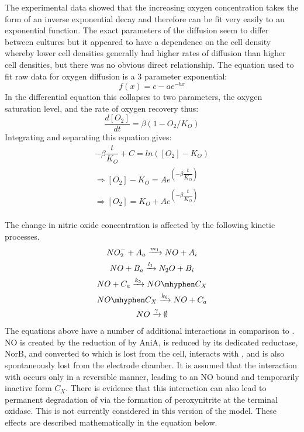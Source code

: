 The experimental data showed that the increasing oxygen concentration takes the form of an inverse exponential decay and therefore can be fit very easily to an exponential function. The exact parameters of the diffusion seem to differ between cultures but it appeared to have a dependence on the cell density whereby lower cell densities generally had higher rates of diffusion than higher cell densities, but there was no obvious direct relationship.
The equation used to fit raw data for oxygen diffusion is a 3 parameter exponential:
\begin{equation*}
f(x) = c - ae^{-bx}
\end{equation*}
In the differential equation this collapses to two parameters, the oxygen saturation level, and the rate of oxygen recovery thus:
\begin{equation*}
\dfrac{d[O_2]}{dt} = \beta(1-O_2/K_O)
\end{equation*}
Integrating and separating this equation gives:
\begin{equation*}
\begin{gathered}
-\beta\dfrac{t}{K_O} + C = ln([O_2]-K_O)\\
\Rightarrow [O_2]-K_O = Ae^{\left(-\beta\dfrac{t}{K_O}\right)}\\
\Rightarrow [O_2] = K_O + Ae^{\left(-\beta\dfrac{t}{K_O}\right)}
\end{gathered}
\end{equation*}
\clearpage
{}\\
The change in nitric oxide concentration is affected by the following kinetic processes.
\begin{equation*}
\begin{gathered}
NO_2^- + A_a \xrightarrow{m_1} NO + A_i\\
NO + B_a \xrightarrow{l_1} N_2O + B_i\\
NO + C_a \xrightarrow{k_5} NO\mhyphen C_X\\
NO\mhyphen C_X \xrightarrow{k_6} NO + C_a\\
NO \xrightarrow{\gamma} \emptyset
\end{gathered}
\end{equation*}
The equations above have a number of additional interactions in comparison to \cOxygen{}. NO is created by the reduction of \cNitrite{} by AniA, is reduced by its dedicated reductase, NorB, and converted to \cNtwoO{} which is lost from the cell, interacts with \cbbthree{}, and is also spontaneously lost from the electrode chamber. It is assumed that the interaction with \cbbthree{} occurs only in a reversible manner, leading to an NO bound and temporarily inactive form $C_X$. There is evidence that this interaction can also lead to permanent degradation of \cbbthree{} via the formation of peroxynitrite at the terminal oxidase\cite{Sharpe1998,Blomberg2005}. This is not currently considered in this version of the model. These effects are described mathematically in the equation below.
